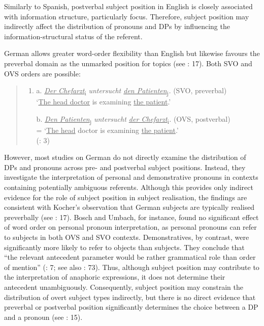 \documentclass[
  letterpaper,
  DIV=11,
  numbers=noendperiod]{scrartcl}
\begin{document}
Similarly to Spanish, postverbal subject position in English is closely
associated with information structure, particularly focus. Therefore,
subject position may indirectly affect the distribution of pronouns and
DPs by influencing the information-structural status of the referent.

German allows greater word-order flexibility than English but likewise
favours the preverbal domain as the unmarked position for topics (see
: 17). Both SVO and OVS
orders are possible:

\begin{quote}
\begin{enumerate}
\def\labelenumi{\arabic{enumi}.}
\setcounter{enumi}{25}
\item
  a. \ul{\emph{Der Chefarzt}}\textsubscript{i} \emph{untersucht \ul{den
  Patienten}}\textsubscript{j}\emph{.} (SVO, preverbal)\\
  `\ul{The head doctor} is examining \ul{the patient}.'

  b. \ul{\emph{Den Patienten}}\textsubscript{j} \emph{untersucht \ul{der
  Chefarzt}}\textsubscript{i}\emph{.} (OVS, postverbal)\\
  = `\ul{The head} doctor is examining \ul{the patient}.'\\
  (: 3)
\end{enumerate}
\end{quote}

However, most studies on German do not directly examine the distribution
of DPs and pronouns across pre- and postverbal subject positions.
Instead, they investigate the interpretation of personal and
demonstrative pronouns in contexts containing potentially ambiguous
referents. Although this provides only indirect evidence for the role of
subject position in subject realisation, the findings are consistent
with Kocher's observation that German subjects are typically realised
preverbally (see : 17). Bosch
and Umbach, for instance, found no significant effect of word order on
personal pronoun interpretation, as personal pronouns can refer to
subjects in both OVS and SVO contexts. Demonstratives, by contrast, were
significantly more likely to refer to objects than subjects. They
conclude that ``the relevant antecedent parameter would be rather
grammatical role than order of mention''
(: 7; see also
: 73). Thus, although subject
position may contribute to the interpretation of anaphoric expressions,
it does not determine their antecedent unambiguously. Consequently,
subject position may constrain the distribution of overt subject types
indirectly, but there is no direct evidence that preverbal or postverbal
position significantly determines the choice between a DP and a pronoun
(see : 15).
\end{document}
